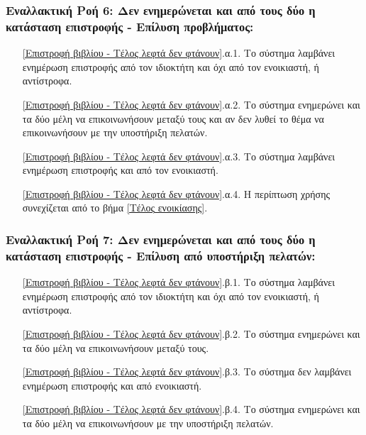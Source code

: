 \documentclass[12pt,a4paper]{article}
\begin{document}
\subsubsection*{Εναλλακτική Ροή 6: Δεν ενημερώνεται και από τους δύο η κατάσταση επιστροφής - Επίλυση προβλήματος:}
\begin{enumerate}
    \item[\ref{Επιστροφή βιβλίου - Τέλος λεφτά δεν φτάνουν}.α.1.] Το σύστημα λαμβάνει ενημέρωση επιστροφής από τον ιδιοκτήτη και όχι από τον ενοικιαστή, ή αντίστροφα.
    \item[\ref{Επιστροφή βιβλίου - Τέλος λεφτά δεν φτάνουν}.α.2.] Το σύστημα ενημερώνει και τα δύο μέλη να επικοινωνήσουν μεταξύ τους και αν δεν λυθεί το θέμα να επικοινωνήσουν με την υποστήριξη πελατών.
    \item[\ref{Επιστροφή βιβλίου - Τέλος λεφτά δεν φτάνουν}.α.3.] Το σύστημα λαμβάνει ενημέρωση επιστροφής και από τον ενοικιαστή.
    \item[\ref{Επιστροφή βιβλίου - Τέλος λεφτά δεν φτάνουν}.α.4.] Η περίπτωση χρήσης συνεχίζεται από το βήμα \ref{Τέλος ενοικίασης}.
\end{enumerate}

\subsubsection*{Εναλλακτική Ροή 7: Δεν ενημερώνεται και από τους δύο η κατάσταση επιστροφής - Επίλυση από υποστήριξη πελατών:}
\begin{enumerate}
    \item[\ref{Επιστροφή βιβλίου - Τέλος λεφτά δεν φτάνουν}.β.1.] Το σύστημα λαμβάνει ενημέρωση επιστροφής από τον ιδιοκτήτη και όχι από τον ενοικιαστή, ή αντίστροφα.
    \item[\ref{Επιστροφή βιβλίου - Τέλος λεφτά δεν φτάνουν}.β.2.] Το σύστημα ενημερώνει και τα δύο μέλη να επικοινωνήσουν μεταξύ τους.
    \item[\ref{Επιστροφή βιβλίου - Τέλος λεφτά δεν φτάνουν}.β.3.] Το σύστημα δεν λαμβάνει ενημέρωση επιστροφής και από ενοικιαστή.
    \item[\ref{Επιστροφή βιβλίου - Τέλος λεφτά δεν φτάνουν}.β.4.] Το σύστημα ενημερώνει και τα δύο μέλη να επικοινωνήσουν με την υποστήριξη πελατών.
\end{enumerate}
\end{document}
